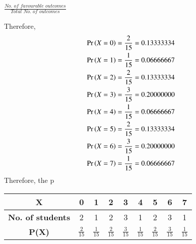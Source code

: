 \documentclass[journal,12pt,twocolumn]{IEEEtran}
\begin{document}
    
$\frac{\textit{No. of favourable outcomes}} {\textit{Total No. of outcomes}}$


Therefore, 
\begin{align*}
    \Pr\left(X=0\right) = \frac {2}{15} = 0.13333334
   \\ \Pr\left(X=1\right) = \frac {1}{15} = 0.06666667
   \\ \Pr\left(X=2\right) = \frac {2}{15} = 0.13333334
   \\ \Pr\left(X=3\right) = \frac {3}{15} = 0.20000000
   \\\Pr\left(X=4\right) = \frac {1}{15} = 0.06666667
   \\ \Pr\left(X=5\right) = \frac {2}{15} = 0.13333334
   \\ \Pr\left(X=6\right) = \frac {3}{15} = 0.20000000
   \\ \Pr\left(X=7\right) = \frac {1}{15} = 0.06666667
\end{align*}
Therefore, the p
\begin{center}
\begin{tabular}{|c|c|c|c|c|c|c|c|c|}
\hline
\textbf{X} & 0 & 1 & 2 & 3 & 4 & 5 & 6 & 7 \\
\hline
\textbf{No. of students} & 2 & 1 & 2 & 3 & 1 & 2 & 3 & 1 \\
\hline

\textbf{P(X)} & $\frac {2}{15}$ & $\frac {1}{15}$ & $\frac {2}{15}$ & $\frac {3}{15}$ & $\frac {1}{15}$ & $\frac {2}{15}$ & $\frac {3}{15}$ & $\frac {1}{15}$
\\

\hline 
\end{tabular}
\end{center}
\end{document}
